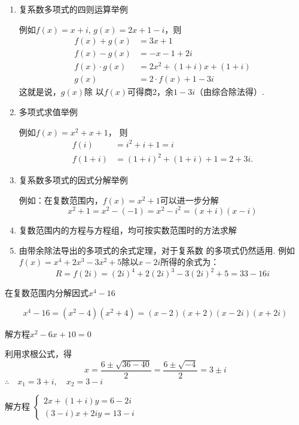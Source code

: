 \begin{enumerate}
    \item 复系数多项式的四则运算举例
    
例如$f(x)=x+i$, $g(x)=2x+1-i$，则
\[\begin{split}
f(x)+g(x)&=3x+1\\
f(x)-g(x)&=-x-1+2i\\
f(x)\cdot g(x)&=2x^2+(1+i)x+(1+i)\\
g(x)&=2\cdot f(x)+1-3i    
\end{split}\]
这就是说，$g(x)$除
以$f(x)$可得商2，余$1-3i$（由综合除法得）.

\item 多项式求值举例

例如$f(x)=x^2+x+1$，
则
\[\begin{split}
  f(i)&=i^2+i+1=i\\
f(1+i)&=(1+i)^2+(1+i)+1=2+3i.  
\end{split}\]

\item 复系数多项式的因式分解举例

例如：在复数范围内，$f(x)=x^2+1$可以进一步分解
\[x^2+1=x^2-(-1)=x^2-i^2=(x+i)(x-i)\]

\item 复数范围内的方程与方程组，均可按实数范围时的方法求解

\item 由带余除法导出的多项式的余式定理，对于复系数
的多项式仍然适用. 例如
$f(x)=x^4+2x^3-3x^2+5$除以$x-2i$所得的余式为：
\[R=f(2i)=(2i)^4+2(2i)^3-3(2i)^2+5
=33-16i\]
\end{enumerate}

\begin{example}
    在复数范围内分解因式$x^4-16$
\end{example}

\begin{solution}
\[x^{4}-16=(x^{2}-4)(x^{2}+4)=(x- 2) (x+ 2) (x- 2i) (x+ 2i)\]
\end{solution}

\begin{example}
    解方程$x^2-6x+10=0$
\end{example}

\begin{solution}
    利用求根公式，得
$$x=\frac{6\pm\sqrt{36-40}}{2}=\frac{6\pm\sqrt{-4}}{2}=3\pm i$$
$\therefore\quad x_{1}= 3+ i,\quad x_{2}= 3- i$
\end{solution}

\begin{example}
     解方程
$\begin{cases}
    2x+(1+i)y=6-2i\\
    (3-i)x+2i y=13-i
\end{cases}$
\end{example}

